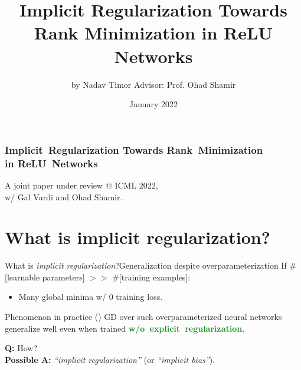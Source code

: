 \documentclass[handout,usenames,dvipsnames]{beamer} %
\title[Implicit Reg.: Rank Min. in ReLU Networks]{Implicit Regularization Towards Rank Minimization in ReLU Networks}
\author[Nadav Timor]{
    by Nadav Timor\newline
    Advisor: Prof. Ohad Shamir
}
\institute[Weizmann Institute]{Weizmann Institute of Science}
\date[January 2022]{January 2022}
\newcommand{\true}[1]{{\textcolor{ForestGreen}{\textbf{#1}}}}
\begin{document}
\frame{\titlepage}

\begin{frame}
    \frametitle{Implicit~Regularization Towards Rank~Minimization\\in ReLU~Networks}
    A joint paper under review @ ICML 2022,\\
    w/ Gal Vardi and Ohad Shamir.
\end{frame}



\section{What is implicit regularization?}

\begin{frame}{What is \emph{implicit regularization}?}{Generalization despite overparameterization}
    \pause
    \newline
    If \#[learnable parameters] $>>$ \#[training examples]:
    \pause
    \begin{itemize}
        \item \alert{Many} global minima w/ $0$ training loss.
    \end{itemize}
    \pause
    \begin{block}{Phenomenon in practice (\cite{zhang2017understanding})}
        GD over such overparameterized neural networks generalize well even when trained \true{w/o~explicit~regularization}.
    \end{block}
    \textbf{Q:} How?\\
    \pause
    \textbf{Possible A:} \emph{``implicit regularization''} (or \emph{``implicit bias''}).
    
\end{frame}
\end{document}
